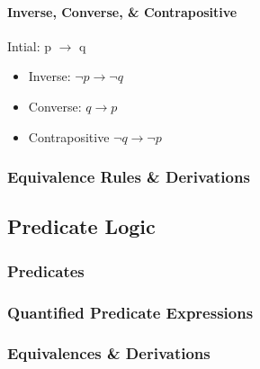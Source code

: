 \documentclass[english, 11pt]{article}
\begin{document}
\begin{addmargin}[2em]{2em}
\begin{itemize}
\begin{itemize}
          \end{itemize}

    \end{itemize}

    \paragraph{Inverse, Converse, \& Contrapositive}

    Intial: p $\to$ q
      \begin{itemize}
        \item Inverse:
         \(\neg p \to \neg q\)
        \item Converse:
         \(q \to p \)
        \item Contrapositive
        \( \neg q \to \neg p\)
      \end{itemize}

  \subsubsection{Equivalence Rules \& Derivations}

\end{addmargin}
\subsection{Predicate Logic}
\subsubsection{Predicates}
\subsubsection{Quantified Predicate Expressions}
\subsubsection{Equivalences \& Derivations}











  
\end{document}
